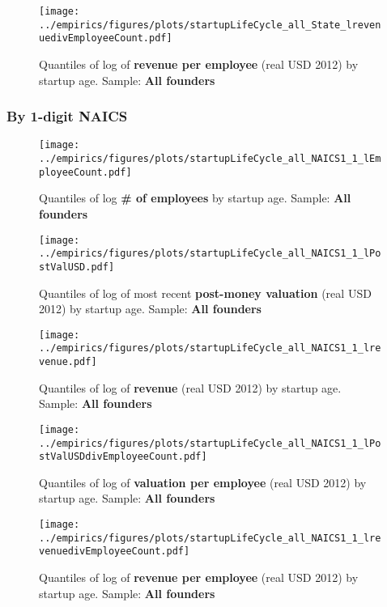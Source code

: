 \documentclass[12pt,english]{article}
\theoremstyle{remark}
\let\Oldsubsubsection\subsubsection
\renewcommand{\subsubsection}{\FloatBarrier\Oldsubsubsection}
\begin{document}
\begin{figure}[!htb]
	\centering
	\texttt{[image: ../empirics/figures/plots/startupLifeCycle\_all\_State\_lrevenuedivEmployeeCount.pdf]}
	\caption{Quantiles of log of \textbf{revenue per employee} (real USD 2012) by startup age. 
		Sample: \textbf{All founders}}
\end{figure}

\subsubsection{By 1-digit NAICS}

\begin{figure}[!htb]
	\centering
	\texttt{[image: ../empirics/figures/plots/startupLifeCycle\_all\_NAICS1\_1\_lEmployeeCount.pdf]}
	\caption{Quantiles of log \textbf{\# of employees} by startup age. 
		Sample: \textbf{All founders}}
\end{figure}

\begin{figure}[!htb]
	\centering
	\texttt{[image: ../empirics/figures/plots/startupLifeCycle\_all\_NAICS1\_1\_lPostValUSD.pdf]}
	\caption{Quantiles of log of most recent \textbf{post-money valuation} (real USD 2012) by startup age. 
		Sample: \textbf{All founders}}
\end{figure}

\begin{figure}[!htb]
	\centering
	\texttt{[image: ../empirics/figures/plots/startupLifeCycle\_all\_NAICS1\_1\_lrevenue.pdf]}
	\caption{Quantiles of log of \textbf{revenue} (real USD 2012) by startup age. 
		Sample: \textbf{All founders}}
\end{figure}

\begin{figure}[!htb]
	\centering
	\texttt{[image: ../empirics/figures/plots/startupLifeCycle\_all\_NAICS1\_1\_lPostValUSDdivEmployeeCount.pdf]}
	\caption{Quantiles of log of \textbf{valuation per employee} (real USD 2012) by startup age. 
		Sample: \textbf{All founders}}
\end{figure}

\begin{figure}[!htb]
	\centering
	\texttt{[image: ../empirics/figures/plots/startupLifeCycle\_all\_NAICS1\_1\_lrevenuedivEmployeeCount.pdf]}
	\caption{Quantiles of log of \textbf{revenue per employee} (real USD 2012) by startup age. 
		Sample: \textbf{All founders}}
\end{figure}
\end{document}
